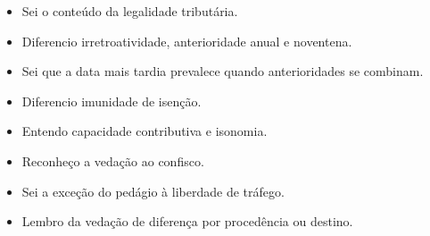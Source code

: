 \documentclass[11pt,a4paper]{article}
\begin{document}
\begin{itemize}
  \item[$\square$] Sei o conteúdo da legalidade tributária.
  \item[$\square$] Diferencio irretroatividade, anterioridade anual e noventena.
  \item[$\square$] Sei que a data mais tardia prevalece quando anterioridades se combinam.
  \item[$\square$] Diferencio imunidade de isenção.
  \item[$\square$] Entendo capacidade contributiva e isonomia.
  \item[$\square$] Reconheço a vedação ao confisco.
  \item[$\square$] Sei a exceção do pedágio à liberdade de tráfego.
  \item[$\square$] Lembro da vedação de diferença por procedência ou destino.
\end{itemize}
\end{document}
